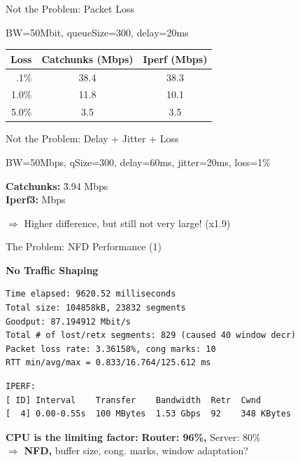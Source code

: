 \begin{frame}[fragile]{Not the Problem: Packet Loss}

BW=50Mbit, queueSize=300, delay=20ms
\vspace{1em}
 

\begin{tabular}{rcc}
\toprule
\textbf{Loss} & \textbf{Catchunks (Mbps)} & \textbf{Iperf (Mbps)} \\ 
\midrule
 .1\% & 38.4  & 38.3 \\
1.0\%		& 11.8  & 10.1 \\
5.0\%		&  3.5	&  3.5 \\
\bottomrule
\end{tabular}

\vspace{1em}


\end{frame}


\begin{frame}[fragile]{Not the Problem: Delay + Jitter + Loss}

BW=50Mbps, qSize=300, delay=60ms, jitter=20ms, loss=1\%

\pause
\vspace{.5em}
 
\begin{tabbing}
\textbf{Catchunks:} \= 3.94 Mbps \\
\textbf{Iperf3:}  Mbps
\end{tabbing}
 
$\Rightarrow$ Higher difference, but still not very large! (x1.9)

\end{frame}



\begin{frame}[fragile]{The Problem: NFD Performance (1)}

\textbf{No Traffic Shaping}
\vspace*{-.5em}

\small
\begin{verbatim}
Time elapsed: 9620.52 milliseconds
Total size: 104858kB, 23832 segments
Goodput: 87.194912 Mbit/s
Total # of lost/retx segments: 829 (caused 40 window decr)
Packet loss rate: 3.36158%, cong marks: 10
RTT min/avg/max = 0.833/16.764/125.612 ms
\end{verbatim}

\pause
\begin{verbatim}
IPERF:
[ ID] Interval    Transfer    Bandwidth  Retr  Cwnd
[  4] 0.00-0.55s  100 MBytes  1.53 Gbps  92    348 KBytes       
\end{verbatim}

\pause
\textbf{CPU is the limiting factor:} \textbf{Router: 96\%,} Server: 80\% \\
$\Rightarrow$ \textbf{NFD,} buffer size, cong. marks, window adaptation?  

\end{frame}


